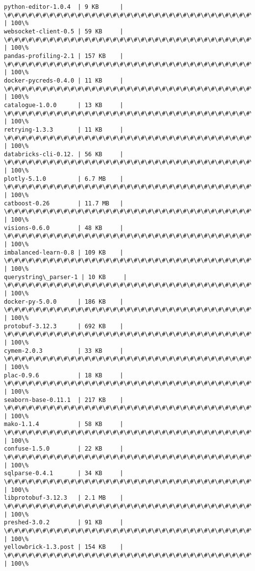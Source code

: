 \documentclass[11pt]{article}
\begin{document}
\begin{Verbatim}[commandchars=\\\{\}]
python-editor-1.0.4  | 9 KB      | \#\#\#\#\#\#\#\#\#\#\#\#\#\#\#\#\#\#\#\#\#\#\#\#\#\#\#\#\#\#\#\#\#\#\#\#\# | 100\%
websocket-client-0.5 | 59 KB     | \#\#\#\#\#\#\#\#\#\#\#\#\#\#\#\#\#\#\#\#\#\#\#\#\#\#\#\#\#\#\#\#\#\#\#\#\# | 100\%
pandas-profiling-2.1 | 157 KB    | \#\#\#\#\#\#\#\#\#\#\#\#\#\#\#\#\#\#\#\#\#\#\#\#\#\#\#\#\#\#\#\#\#\#\#\#\# | 100\%
docker-pycreds-0.4.0 | 11 KB     | \#\#\#\#\#\#\#\#\#\#\#\#\#\#\#\#\#\#\#\#\#\#\#\#\#\#\#\#\#\#\#\#\#\#\#\#\# | 100\%
catalogue-1.0.0      | 13 KB     | \#\#\#\#\#\#\#\#\#\#\#\#\#\#\#\#\#\#\#\#\#\#\#\#\#\#\#\#\#\#\#\#\#\#\#\#\# | 100\%
retrying-1.3.3       | 11 KB     | \#\#\#\#\#\#\#\#\#\#\#\#\#\#\#\#\#\#\#\#\#\#\#\#\#\#\#\#\#\#\#\#\#\#\#\#\# | 100\%
databricks-cli-0.12. | 56 KB     | \#\#\#\#\#\#\#\#\#\#\#\#\#\#\#\#\#\#\#\#\#\#\#\#\#\#\#\#\#\#\#\#\#\#\#\#\# | 100\%
plotly-5.1.0         | 6.7 MB    | \#\#\#\#\#\#\#\#\#\#\#\#\#\#\#\#\#\#\#\#\#\#\#\#\#\#\#\#\#\#\#\#\#\#\#\#\# | 100\%
catboost-0.26        | 11.7 MB   | \#\#\#\#\#\#\#\#\#\#\#\#\#\#\#\#\#\#\#\#\#\#\#\#\#\#\#\#\#\#\#\#\#\#\#\#\# | 100\%
visions-0.6.0        | 48 KB     | \#\#\#\#\#\#\#\#\#\#\#\#\#\#\#\#\#\#\#\#\#\#\#\#\#\#\#\#\#\#\#\#\#\#\#\#\# | 100\%
imbalanced-learn-0.8 | 109 KB    | \#\#\#\#\#\#\#\#\#\#\#\#\#\#\#\#\#\#\#\#\#\#\#\#\#\#\#\#\#\#\#\#\#\#\#\#\# | 100\%
querystring\_parser-1 | 10 KB     | \#\#\#\#\#\#\#\#\#\#\#\#\#\#\#\#\#\#\#\#\#\#\#\#\#\#\#\#\#\#\#\#\#\#\#\#\# | 100\%
docker-py-5.0.0      | 186 KB    | \#\#\#\#\#\#\#\#\#\#\#\#\#\#\#\#\#\#\#\#\#\#\#\#\#\#\#\#\#\#\#\#\#\#\#\#\# | 100\%
protobuf-3.12.3      | 692 KB    | \#\#\#\#\#\#\#\#\#\#\#\#\#\#\#\#\#\#\#\#\#\#\#\#\#\#\#\#\#\#\#\#\#\#\#\#\# | 100\%
cymem-2.0.3          | 33 KB     | \#\#\#\#\#\#\#\#\#\#\#\#\#\#\#\#\#\#\#\#\#\#\#\#\#\#\#\#\#\#\#\#\#\#\#\#\# | 100\%
plac-0.9.6           | 18 KB     | \#\#\#\#\#\#\#\#\#\#\#\#\#\#\#\#\#\#\#\#\#\#\#\#\#\#\#\#\#\#\#\#\#\#\#\#\# | 100\%
seaborn-base-0.11.1  | 217 KB    | \#\#\#\#\#\#\#\#\#\#\#\#\#\#\#\#\#\#\#\#\#\#\#\#\#\#\#\#\#\#\#\#\#\#\#\#\# | 100\%
mako-1.1.4           | 58 KB     | \#\#\#\#\#\#\#\#\#\#\#\#\#\#\#\#\#\#\#\#\#\#\#\#\#\#\#\#\#\#\#\#\#\#\#\#\# | 100\%
confuse-1.5.0        | 22 KB     | \#\#\#\#\#\#\#\#\#\#\#\#\#\#\#\#\#\#\#\#\#\#\#\#\#\#\#\#\#\#\#\#\#\#\#\#\# | 100\%
sqlparse-0.4.1       | 34 KB     | \#\#\#\#\#\#\#\#\#\#\#\#\#\#\#\#\#\#\#\#\#\#\#\#\#\#\#\#\#\#\#\#\#\#\#\#\# | 100\%
libprotobuf-3.12.3   | 2.1 MB    | \#\#\#\#\#\#\#\#\#\#\#\#\#\#\#\#\#\#\#\#\#\#\#\#\#\#\#\#\#\#\#\#\#\#\#\#\# | 100\%
preshed-3.0.2        | 91 KB     | \#\#\#\#\#\#\#\#\#\#\#\#\#\#\#\#\#\#\#\#\#\#\#\#\#\#\#\#\#\#\#\#\#\#\#\#\# | 100\%
yellowbrick-1.3.post | 154 KB    | \#\#\#\#\#\#\#\#\#\#\#\#\#\#\#\#\#\#\#\#\#\#\#\#\#\#\#\#\#\#\#\#\#\#\#\#\# | 100\%

\end{Verbatim}
\end{document}
